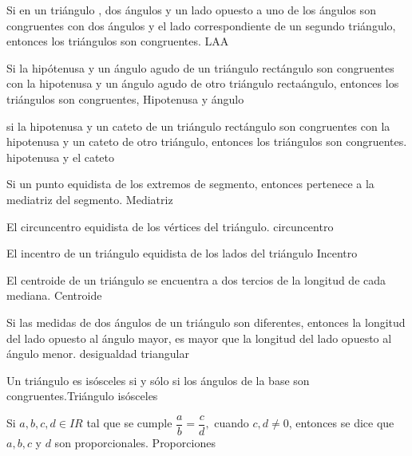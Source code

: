 \begin{teorema}{
Si en un tri\'angulo , dos \'angulos y un lado opuesto a uno de los \'angulos
son congruentes con dos \'angulos y el lado correspondiente de un segundo
tri\'angulo, entonces los tri\'angulos son congruentes.
}{LAA}
\end{teorema}

\begin{teorema}{
Si la hip\'otenusa y un \'angulo agudo de un tri\'angulo rect\'angulo son
congruentes con la hipotenusa y un \'angulo agudo de otro tri\'angulo
recta\'angulo, entonces los tri\'angulos son congruentes,
}{Hipotenusa y \'angulo}
\end{teorema}

\begin{teorema}{si la hipotenusa y un cateto de un tri\'angulo rect\'angulo son
congruentes con la hipotenusa y un cateto de otro tri\'angulo, entonces los
tri\'angulos son congruentes.
}{hipotenusa y el cateto}
\end{teorema}
\begin{teorema}{
Si un punto equidista de los extremos de segmento, entonces pertenece a la
mediatriz del segmento.
}{Mediatriz}
 \end{teorema}
\begin{teorema}{
El circuncentro equidista de los v\'ertices del tri\'angulo.
}{circuncentro}
\end{teorema}
\begin{teorema}{
El incentro de un tri\'angulo equidista de los lados del tri\'angulo
}{Incentro}
\end{teorema}
\begin{teorema}{
El centroide de un tri\'angulo se encuentra a dos tercios de la longitud de
cada mediana. 
}{Centroide}
 
\end{teorema}
\begin{teorema}{
Si las medidas de dos \'angulos de un tri\'angulo son diferentes, entonces la
longitud del lado opuesto al \'angulo mayor, es mayor que la longitud del
lado opuesto al \'angulo menor.
}{desigualdad triangular}
\end{teorema}
\begin{conjetura}{Un tri\'angulo es
is\'osceles si y s\'olo si los
\'angulos de la base son congruentes.}{Tri\'angulo is\'osceles}
 \end{conjetura}
\begin{definicion}{ Si $a,b,c,d \in I\! \! R $
 tal que se cumple $\dfrac{a}{b}=\dfrac{c}{d}, $ cuando $c,d\neq 0$, entonces
se dice que $a,b,c$ y $d$ son proporcionales.
}{Proporciones}
 \end{definicion}
